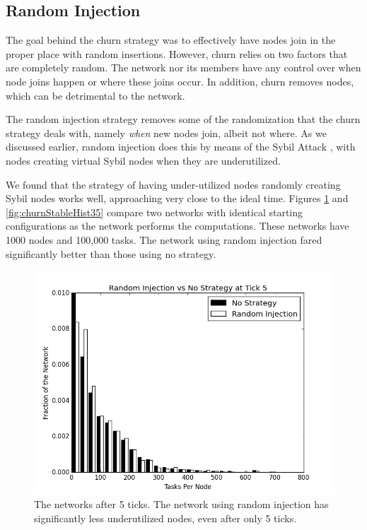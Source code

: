 \documentclass[10pt,conference]{IEEEtran}
\begin{document}
	\subsection{Random Injection}
	
	The goal behind the churn strategy was to effectively have nodes join in the proper place with random insertions.
	However, churn relies on two factors that are completely random.
	The network nor its members have any control over when node joins happen or where these joins occur.
	In addition, churn removes nodes, which can be detrimental to the network.
	
	The random injection strategy removes some of the randomization that the churn strategy deals with, namely \textit{when} new nodes join, albeit not where.
	As we discussed earlier, random injection does this by means of the Sybil Attack \cite{sybil}, with nodes creating virtual Sybil nodes when they are underutilized.
	
	We found that the strategy of having under-utilized nodes randomly creating Sybil nodes works well, approaching very close to the ideal time.
	Figures \ref{fig:randomStableHist5} and \ref{fig:churnStableHist35} compare two networks with identical starting configurations as the network performs the computations.
	These networks have 1000 nodes and 100,000 tasks.  
	The network using random injection fared significantly better than those using no strategy.
	
	
	\begin{figure}
		\centering
		\includegraphics[width=0.9\linewidth]{figs/randomStableHist5}
		\caption[Random injection vs no strategy after 5 ticks.]{The networks after 5 ticks.  The network using random injection has significantly less underutilized nodes, even after only 5 ticks.}
		\label{fig:randomStableHist5}
	\end{figure}
	
\end{document}
